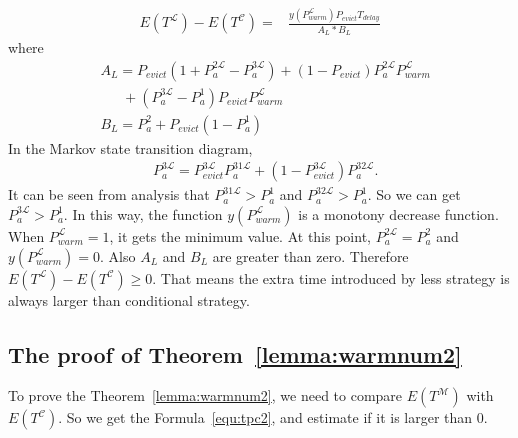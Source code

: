 \begin{equation}
\label{equ:detail1}
\begin{split}
E(T^{\mathcal{L}}) - E(T^{\mathcal{C}}) = &\frac{y(P_{warm}^{\mathcal{L}})P_{evict}T_{delay}}{A_{L}*B_{L}}
\end{split}\end{equation}
where
\begin{equation*}
\begin{split}
&A_{L}=P_{evict}(1+P_{a}^{\mathfrak{2}\mathcal{L}}-P_{a}^{\mathfrak{3}\mathcal{L}})+(1-P_{evict})P_{a}^{\mathfrak{2}\mathcal{L}}P_{warm}^{\mathcal{L}}  \\
&\ \ \ \ \ \ \ +(P_{a}^{\mathfrak{3}\mathcal{L}}-P_{a}^{\mathfrak{1}})P_{evict}P_{warm}^{\mathcal{L}} \\
&B_{L}=P_{a}^{\mathfrak{2}}+P_{evict}(1-P_{a}^{\mathfrak{1}})
\end{split}\end{equation*}
In the Markov state transition diagram,
\begin{equation*}
\begin{split}
&P_{a}^{\mathfrak{3}\mathcal{L}}=P_{evict}^{\mathfrak{3}\mathcal{L}}P_{a}^{\mathfrak{31}\mathcal{L}}+(1-P_{evict}^{\mathfrak{3}\mathcal{L}})P_{a}^{\mathfrak{32}\mathcal{L}} .
\end{split}\end{equation*}
It can be seen from analysis that $P_{a}^{\mathfrak{31}\mathcal{L}} > P_{a}^{\mathfrak{1}}$ and $P_{a}^{\mathfrak{32}\mathcal{L}} > P_{a}^{\mathfrak{1}}$.
So we can get $P_{a}^{\mathfrak{3}\mathcal{L}} > P_{a}^{\mathfrak{1}}$.
In this way,
the function $y(P_{warm}^{\mathcal{L}})$ is a monotony decrease function. When $P_{warm}^{\mathcal{L}} = 1$, it gets the minimum value.
At this point, $P_{a}^{\mathfrak{2}\mathcal{L}} = P_{a}^{\mathfrak{2}}$ and $y(P_{warm}^{\mathcal{L}}) = 0$.
Also $A_{L}$ and $B_{L}$ are greater than zero.
Therefore $E(T^{\mathcal{L}}) - E(T^{\mathcal{C}})\geq 0$.
That means the extra time introduced by less {\vwarm} strategy is always larger than conditional {\vwarm} strategy.

\subsection{The proof of Theorem~\ref{lemma:warmnum2}}
To prove the Theorem~\ref{lemma:warmnum2}, we need to compare $E(T^{\mathcal{M}})$ with $E(T^{\mathcal{C}})$.
So we get the Formula~\ref{equ:tpc2}, and estimate if it is larger than $0$.

